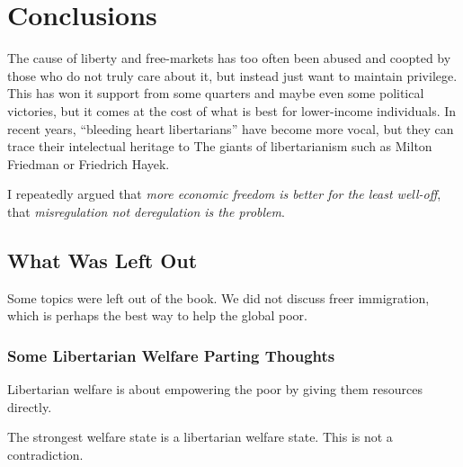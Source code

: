 \chapter{Conclusions}

The cause of liberty and free-markets has too often been abused and coopted by
those who do not truly care about it, but instead just want to maintain
privilege. This has won it support from some quarters and maybe even some
political victories, but it comes at the cost of what is best for lower-income
individuals. In recent years, ``bleeding heart libertarians'' have become more
vocal, but they can trace their intelectual heritage to The giants of
libertarianism such as Milton Friedman or Friedrich Hayek.

I repeatedly argued that \emph{more economic freedom is better for the least
well-off}, that \emph{misregulation not deregulation is the problem}.

\section{What Was Left Out}

Some topics were left out of the book. We did not discuss freer immigration,
which is perhaps the best way to help the global poor. 

\subsection{Some Libertarian Welfare Parting Thoughts}

\thought Libertarian welfare is about empowering the poor by giving them
resources directly.

\thought The strongest welfare state is a libertarian welfare state. This is
not a contradiction.

